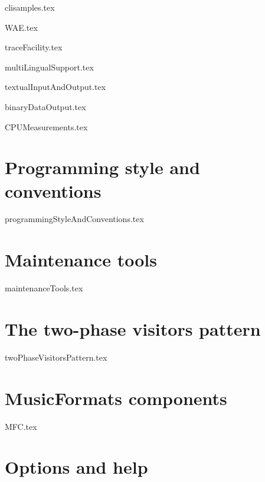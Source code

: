 \documentclass[11pt,a4paper]{report}
\begin{document}
{clisamples.tex}

{WAE.tex}

{traceFacility.tex}

{multiLingualSupport.tex}

{textualInputAndOutput.tex}

{binaryDataOutput.tex}

{CPUMeasurements.tex}


\part{Programming style and conventions}

{programmingStyleAndConventions.tex}


\part{Maintenance tools}

{maintenanceTools.tex}


\part{The two-phase visitors pattern}

{twoPhaseVisitorsPattern.tex}


\part{MusicFormats components}

{MFC.tex}


\part{Options and help}
\end{document}
